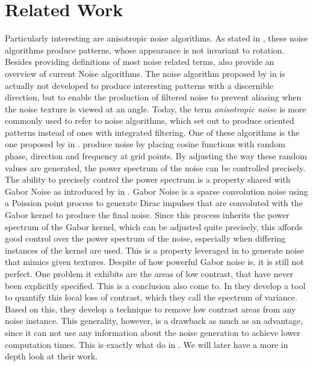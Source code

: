 \documentclass{utue} %
\begin{document}
\section{Related Work}
Particularly interesting are anisotropic noise algorithms. As stated in \cite{survey}, these noise algorithms produce patterns, whose appearance is not invariant to rotation. Besides providing definitions of most noise related terms, \citeauthor{survey} also provide an overview of current Noise algorithms. The noise algorithm proposed by \citeauthor{anisotropicNoise} in \cite{anisotropicNoise} is actually not developed to produce interesting patterns with a discernible direction, but to enable the production of filtered noise to prevent aliasing when the noise texture is viewed at an angle. Today, the term \textit{anisotropic noise} is more commonly used to refer to noise algorithms, which set out to produce oriented patterns instead of ones with integrated filtering. One of these algorithms is the one proposed by \citeauthor{randomPhaseNoise} in \cite{randomPhaseNoise}. \citeauthor{randomPhaseNoise} produce noise by placing cosine functions with random phase, direction and frequency at grid points. By adjusting the way these random values are generated, the power spectrum of the noise can be controlled precisely. The ability to precisely control the power spectrum is a property shared with Gabor Noise as introduced by \citeauthor{gaborNoise} in \cite{gaborNoise}. Gabor Noise is a sparse convolution noise using a Poission point process to generate Dirac impulses that are convoluted with the Gabor kernel to produce the final noise. Since this process inherits the power spectrum of the Gabor kernel, which can be adjusted quite precisely, this affords good control over the power spectrum of the noise, especially when differing instances of the kernel are used. This is a property leveraged in \cite{gaborNoiseByExample} to generate noise that mimics given textures. Despite of how powerful Gabor noise is, it is still not perfect. One problem it exhibits are the areas of low contrast, that have never been explicitly specified. This is a conclusion \citeauthor{spectrumOfVariance} also come to. In \cite{spectrumOfVariance} they develop a tool to quantify this local loss of contrast, which they call the spectrum of variance. Based on this, they develop a technique to remove low contrast areas from any noise instance. This generality, however, is a drawback as much as an advantage, since it can not use any information about the noise generation to achieve lower computation times. This is exactly what \citeauthor{phasorNoise} do in \cite{phasorNoise}. We will later have a more in depth look at their work.\\
\end{document}
